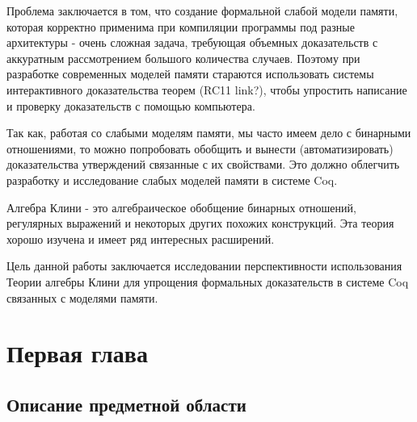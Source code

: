 \documentclass[times
              ]{itmo-student-thesis}
\begin{document}
Проблема заключается в том, что создание формальной слабой модели памяти, которая корректно применима при компиляции программы под разные архитектуры - очень сложная задача, требующая объемных доказательств с аккуратным рассмотрением большого количества случаев.
Поэтому при разработке современных моделей памяти стараются использовать системы интерактивного доказательства теорем (RC11 link?), чтобы упростить написание и проверку доказательств с помощью компьютера.

Так как, работая со слабыми моделям памяти, мы часто имеем дело с бинарными отношениями, то можно попробовать обобщить и вынести (автоматизировать) доказательства утверждений связанные с их свойствами.
Это должно облегчить разработку и исследование слабых моделей памяти в системе Coq.

Алгебра Клини - это алгебраическое обобщение бинарных отношений, регулярных выражений и некоторых других похожих конструкций.
Эта теория хорошо изучена и имеет ряд интересных расширений.

Цель данной работы заключается исследовании перспективности использования Теории алгебры Клини для упрощения формальных доказательств в системе Coq связанных с моделями памяти.


\chapter{Первая глава}
  \section{Описание предметной области}


\end{document}
